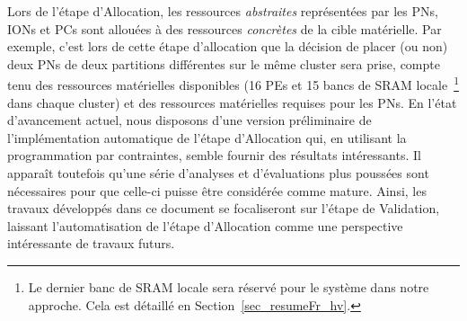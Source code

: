\documentclass[main.tex]{subfiles}
\begin{document}
Lors de l'étape d'Allocation, les ressources \emph{abstraites} représentées par les PNs, IONs et PCs sont allouées à des ressources \emph{concrètes} de la cible matérielle. Par exemple, c'est lors de cette étape d'allocation que la décision de placer (ou non) deux PNs de deux partitions différentes sur le même cluster sera prise, compte tenu des ressources matérielles disponibles (16 PEs et 15 bancs de SRAM locale~\footnote{Le dernier banc de SRAM locale sera réservé pour le système dans notre approche. Cela est détaillé en Section~\ref{sec_resumeFr_hv}.} dans chaque cluster) et des ressources matérielles requises pour les PNs. En l'état d'avancement actuel, nous disposons d'une version préliminaire de l'implémentation automatique de l'étape d'Allocation qui, en utilisant la programmation par contraintes, semble fournir des résultats intéressants. Il apparaît toutefois qu'une série d'analyses et d'évaluations plus poussées sont nécessaires pour que celle-ci puisse être considérée comme mature. Ainsi, les travaux développés dans ce document se focaliseront sur l'étape de Validation, laissant l'automatisation de l'étape d'Allocation comme une perspective intéressante de travaux futurs. 
\end{document}
